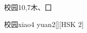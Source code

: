 \begin{entry}{校园}{10,7}{⽊、⼞}
  \begin{phonetics}{校园}{xiao4 yuan2}[][HSK 2]
  \end{phonetics}
\end{entry}
